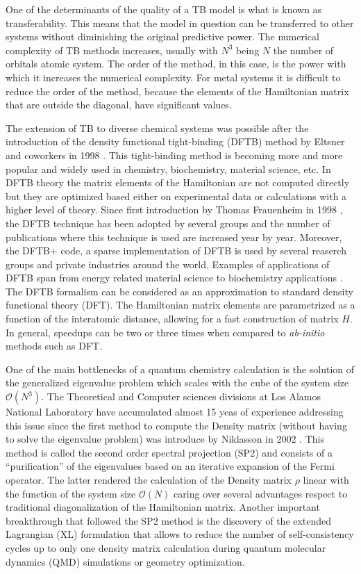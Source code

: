 One of the determinants of the quality of a TB model is what is known as
transferability. This means that the model in question can be transferred to other
systems without diminishing the original predictive power. The numerical complexity
of TB methods increases, usually with $N^3$ being $N$ the number of orbitals
atomic system. The order of the method, in this case, is the power with which it increases
the numerical complexity. For metal systems it is difficult to reduce the order of the method,
because the elements of the Hamiltonian matrix that are outside the diagonal, have significant values.

The extension of TB to diverse chemical systems was possible after the introduction of the density functional tight-binding (DFTB) method by Eltsner and coworkers in 1998 \cite{Elstner1998}. This tight-binding method is becoming more and more popular and widely used in chemistry, biochemistry, material science, etc. In DFTB theory the matrix elements of the Hamiltonian are not computed directly but they are optimized based either on experimental data or calculations with a higher level of theory. Since first introduction by Thomas Frauenheim \cite{Thomas} in 1998 \cite{Elstner1998}, the DFTB technique has been adopted by several groups and the number of publications where this technique is used are increased year by year. Moreover, the DFTB+ code, a sparse implementation of DFTB\cite{Houraine2007} is used by several reaserch groups and private industries around the world. Examples of applications of DFTB span from energy related material science to biochemistry applications \cite{Elstner2014}.
The DFTB formalism can be considered as an approximation to standard density functional theory (DFT). The Hamiltonian matrix elements are parametrized as a function of the interatomic distance, allowing for a fast construction of matrix $H$. In general, speedups can be two or three times when compared to \emph{ab-initio} methods such as DFT. \cite{Kosk2009}

One of the main bottlenecks of a quantum chemistry calculation is the solution of the generalized eigenvalue problem which scales with the cube of the system size $\mathcal{O}(N^3)$. The Theoretical and Computer sciences divisions at Los Alamos National Laboratory have accumulated almost 15 yeas of experience addressing this issue since the first method to compute the Density matrix (without having to solve the eigenvalue problem) was introduce by Niklasson in 2002 \cite{Niklasson}. This method is called the second order spectral projection (SP2) and consists of a ``purification'' of the eigenvalues based on an iterative expansion of the Fermi operator. The latter rendered the calculation of the Density matrix $\rho$ linear with the function of the system size $\mathcal{O}(N)$ caring over several advantages respect to traditional diagonalization of the Hamiltonian matrix. Another important breakthrough that followed the SP2 method is the discovery of the extended Lagrangian (XL) formulation\cite{Niklasson2006, Niklasson2008} that allows to reduce the number of self-consistency cycles up to only one density matrix calculation during quantum molecular dynamics (QMD) simulations or geometry optimization. 

